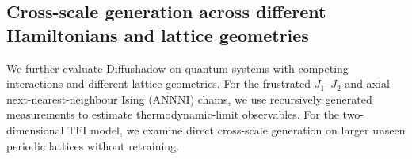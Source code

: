 \documentclass[pdflatex,sn-nature]{sn-jnl}%
\theoremstyle{thmstyleone}%
\theoremstyle{thmstyletwo}%
\theoremstyle{thmstylethree}%
\begin{document}
\subsection{Cross-scale generation across different Hamiltonians and lattice geometries}




We further evaluate Diffushadow on quantum systems with competing interactions and different lattice geometries. For the frustrated $J_1$--$J_2$ and axial next-nearest-neighbour Ising (ANNNI) chains, we use recursively generated measurements to estimate thermodynamic-limit observables. For the two-dimensional TFI model, we examine direct cross-scale generation on larger unseen periodic lattices without retraining.

\end{document}
